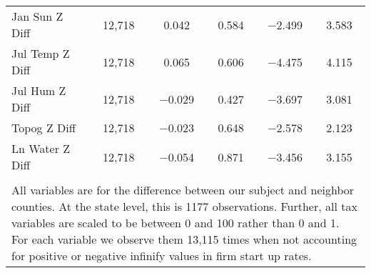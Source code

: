 \begin{table}[!htbp]
\begin{tabular}{@{\extracolsep{5pt}}lccccc}
Jan Sun Z Diff & 12,718 & 0.042 & 0.584 & $-$2.499 & 3.583 \\ 
Jul Temp Z Diff & 12,718 & 0.065 & 0.606 & $-$4.475 & 4.115 \\ 
Jul Hum Z Diff & 12,718 & $-$0.029 & 0.427 & $-$3.697 & 3.081 \\ 
Topog Z Diff & 12,718 & $-$0.023 & 0.648 & $-$2.578 & 2.123 \\ 
Ln Water Z Diff & 12,718 & $-$0.054 & 0.871 & $-$3.456 & 3.155 \\ 
\hline \\[-1.8ex] 
\multicolumn{6}{l}{All variables are for the difference between our subject and neighbor counties. At the state level, this is 1177 observations. Further, all tax variables are scaled to be between 0 and 100 rather than 0 and 1. For each variable we observe them 13,115 times when not accounting for positive or negative infinify values in firm start up rates.} \\ 
\end{tabular} 
\end{table} 
